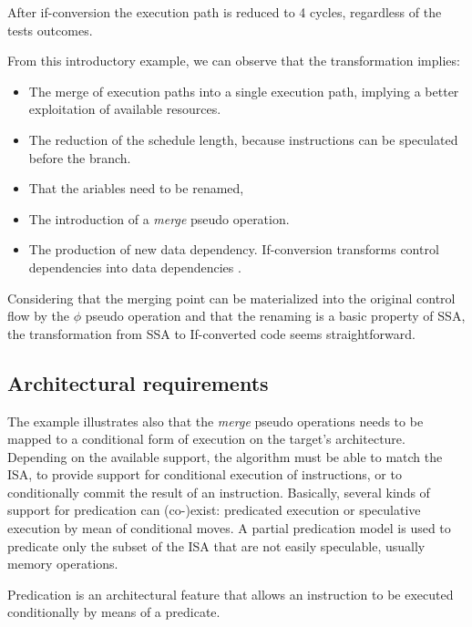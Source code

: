 After if-conversion the execution path is reduced to 4 cycles, regardless of the tests outcomes. 

From this introductory example, we can observe that the transformation implies:

\begin{itemize}
\item The merge of execution paths into a single execution path, implying a  better exploitation of available resources.  
\item The reduction of the schedule length, because instructions can be speculated before the branch.
\item That the ariables need to be renamed, 
\item The introduction of a \textit{merge} pseudo operation.
\item The production of new data dependency. If-conversion transforms control dependencies into data dependencies \cite{Allen:1983:CCD:567067.567085}. 
\end{itemize}

Considering that the merging point can be materialized into the original control flow by the $\phi$ pseudo operation and that the renaming is a basic property of SSA, the transformation from SSA to If-converted code seems straightforward.

\subsection{Architectural requirements}
The example illustrates also that the \textit{merge} pseudo operations needs to be mapped to a conditional form of execution on the target's architecture. Depending on the available support, the algorithm must be able to match the ISA, to provide support for conditional execution of instructions, or to conditionally commit the result of an instruction.
Basically, several kinds of support for predication can (co-)exist: predicated execution  or speculative execution by mean of conditional moves. A partial predication model is used to predicate only the subset of the ISA that are not easily speculable, usually memory operations.

Predication is an architectural feature that allows an instruction to be executed conditionally by means of a predicate.

